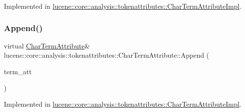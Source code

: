 Implemented in \mbox{\hyperlink{classlucene_1_1core_1_1analysis_1_1tokenattributes_1_1CharTermAttributeImpl_a1f8dccf1ecc42396f7f97b6a1972325f}{lucene\+::core\+::analysis\+::tokenattributes\+::\+Char\+Term\+Attribute\+Impl}}.

\mbox{\label{classlucene_1_1core_1_1analysis_1_1tokenattributes_1_1CharTermAttribute_ad8624358a4798446a14fbf35991c43ad}} 
\subsubsection{\texorpdfstring{Append()}{Append()}\hspace{0.1cm}{\footnotesize\ttfamily [4/4]}}
{\footnotesize\ttfamily virtual \mbox{\hyperlink{classlucene_1_1core_1_1analysis_1_1tokenattributes_1_1CharTermAttribute}{Char\+Term\+Attribute}}\& lucene\+::core\+::analysis\+::tokenattributes\+::\+Char\+Term\+Attribute\+::\+Append (\begin{DoxyParamCaption}\item[{const \mbox{\hyperlink{classlucene_1_1core_1_1analysis_1_1tokenattributes_1_1CharTermAttribute}{Char\+Term\+Attribute}} \&}]{term\+\_\+att }\end{DoxyParamCaption})\hspace{0.3cm}{\ttfamily [pure virtual]}}



Implemented in \mbox{\hyperlink{classlucene_1_1core_1_1analysis_1_1tokenattributes_1_1CharTermAttributeImpl_ab8c8f791a3a504d86b3578a6f43810d1}{lucene\+::core\+::analysis\+::tokenattributes\+::\+Char\+Term\+Attribute\+Impl}}.

\mbox{\label{classlucene_1_1core_1_1analysis_1_1tokenattributes_1_1CharTermAttribute_abc9fbea4b68b4cdbb1d120970c71d38e}} 
